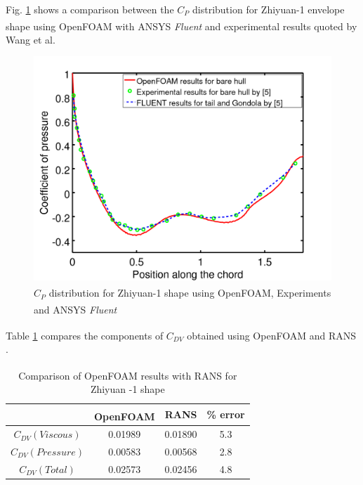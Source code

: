 Fig. \ref{Zhiyuan_OF_RANS} shows a comparison between the $C_{P}$ distribution for Zhiyuan-1 envelope shape using  OpenFOAM\textsuperscript{\textregistered} with ANSYS\textsuperscript{\textregistered} \textit{Fluent} and experimental results quoted by Wang et al. \cite{Wang2010}
\begin{figure}[H]
	\centering
	\includegraphics[width=270 pt]{rnd/zhiyuan_cp.png}
	\caption{$C_{P}$ distribution for Zhiyuan-1 shape using OpenFOAM\textsuperscript{\textregistered}, Experiments \cite{Wang2010} and ANSYS\textsuperscript{\textregistered} \textit{Fluent} \cite{Wang2010}}
	\label{Zhiyuan_OF_RANS} %
\end{figure}

Table \ref{Zhiyuan -1 Cdv} compares the components of $C_{DV}$ obtained using OpenFOAM\textsuperscript{\textregistered} and RANS \cite{Suman2011}.

\begin{table}[H]
	\centering
	\caption{\label{Zhiyuan -1 Cdv} Comparison of OpenFOAM\textsuperscript{\textregistered} results with RANS \cite{Suman2011} for Zhiyuan -1 shape}
	\begin{tabular}{cccc}
		\hline \hline
		& OpenFOAM\textsuperscript{\textregistered} & RANS \cite{Suman2011} & \% error    \\ \hline \hline
		
		$ C_{DV} (Viscous)$ & 0.01989 & 0.01890 & 5.3    \\  
		$ C_{DV} (Pressure) $ & 0.00583 & 0.00568 & 2.8    \\
		$ C_{DV} (Total) $ & 0.02573 & 0.02456 & 4.8    \\  \hline
	\end{tabular}
\end{table}


